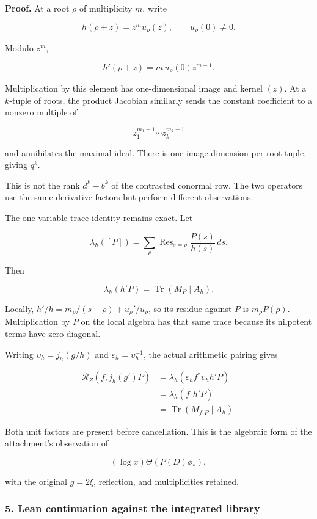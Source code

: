 \textbf{Proof.} At a root \(\rho\) of multiplicity \(m\), write

\[
h(\rho+z)=z^m u_\rho(z),\qquad u_\rho(0)\ne0.
\]

Modulo \(z^m\),

\[
h'(\rho+z)=m\,u_\rho(0)z^{m-1}.
\]

Multiplication by this element has one-dimensional image and kernel \((z)\). At a \(k\)-tuple of
roots, the product Jacobian similarly sends the constant coefficient to a nonzero multiple of

\[
z_1^{m_1-1}\cdots z_k^{m_k-1}
\]

and annihilates the maximal ideal. There is one image dimension per root tuple, giving \(q^k\).

This is not the rank \(d^k-b^k\) of the contracted conormal row. The two operators use the same
derivative factors but perform different observations.

The one-variable trace identity remains exact. Let

\[
\lambda_h([P])
=
\sum_{\rho}\operatorname{Res}_{s=\rho}\frac{P(s)}{h(s)}\,ds.
\]

Then

\[
\boxed{
\lambda_h(h'P)
=
\operatorname{Tr}(M_P\mid A_h).
}
\]

Locally, \(h'/h=m_\rho/(s-\rho)+u_\rho'/u_\rho\), so its residue against \(P\) is
\(m_\rho P(\rho)\). Multiplication by \(P\) on the local algebra has that same trace because its
nilpotent terms have zero diagonal.

Writing \(\upsilon_h=j_h(g/h)\) and \(\varepsilon_h=\upsilon_h^{-1}\), the actual arithmetic pairing
gives

\[
\begin{aligned}
\mathscr R_Z(f,j_h(g')P)
&=\lambda_h\!\left(
\varepsilon_h f^\dagger\upsilon_h h'P
\right)\\
&=\lambda_h(f^\dagger h'P)\\
&=\operatorname{Tr}(M_{f^\dagger P}\mid A_h).
\end{aligned}
\]

Both unit factors are present before cancellation. This is the algebraic form of the attachment's
observation of

\[
(\log x)\Theta(P(D)\phi_*),
\]

with the original \(g=2\xi\), reflection, and multiplicities retained.

\subsubsection{5. Lean continuation against the integrated
library}\label{conormal_tower_pasted:lean-continuation-against-the-integrated-library}


